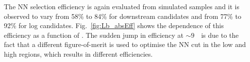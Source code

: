 %
%
The NN selection efficiency is again evaluated from simulated samples
and it is observed to vary from 58\% to 84\% for downstream candidates
and from 77\% to 92\% for log candidates.
Fig.~\ref{fig:Lb_absEff} shows the dependence of this efficiency as a function of \qsq.
The sudden jump in efficiency at $\sim 9$~\gevcc~is due to the fact that
a different figure-of-merit is used to optimise the NN cut in the low and high \qsq regions,
which results in different efficiencies.
%
